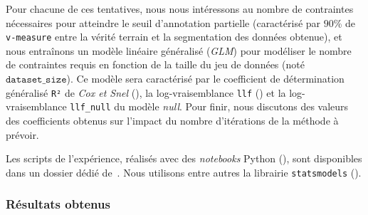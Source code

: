			Pour chacune de ces tentatives, nous nous intéressons au nombre de contraintes nécessaires pour atteindre le seuil d'annotation partielle (caractérisé par $90$\% de \texttt{v-measure} entre la vérité terrain et la segmentation des données obtenue), et nous entraînons un modèle linéaire généralisé (\textit{GLM}) pour modéliser le nombre de contraintes requis en fonction de la taille du jeu de données (noté $\texttt{dataset\_size}$).
			Ce modèle sera caractérisé par le coefficient de détermination généralisé \texttt{R²} de \textit{Cox et Snel} (\cite{diamond-etal:1990:analysis-binary-data}), la log-vraisemblance \texttt{llf} (\cite{edwards:1992:likelihood}) et la log-vraisemblance \texttt{llf\_null} du modèle \textit{null}.
			Pour finir, nous discutons des valeurs des coefficients obtenus sur l'impact du nombre d'itérations de la méthode à prévoir.

			\begin{leftBarInformation}
				Les scripts de l'expérience, réalisés avec des \textit{notebooks} Python (\cite{van-rossum-drake:2009:python-reference-manual}), sont disponibles dans un dossier dédié de~\cite{schild:2021:cognitivefactory-interactiveclusteringcomparativestudy}.
				Nous utilisons entre autres la librairie \texttt{statsmodels} (\cite{seabold-perktold:2010:statsmodels-econometric-statistical}).
			\end{leftBarInformation}

		\subsubsection{Résultats obtenus}
		

